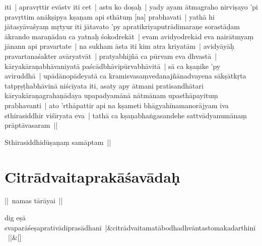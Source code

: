 \documentclass[article,12pt,a4paper]{memoir}%
\newcounter{parCount}
\begin{document}
	  \pstart \leavevmode%
	iti | apravṛttir evāstv iti cet | \label{thakur75-127.29} astu ko doṣaḥ | yady ayam ātmagraho nirviṣayo 'pi pravṛttim anākṣipya kṣaṇam api sthātuṃ [na] prabhavati | yathā hi jātasyāvaśyaṃ mṛtyur iti jātavato 'py apratikriyaputrādimaraṇe sorastāḍam ākrando maraṇādau ca yatnaḥ śokodrekāt | evam avidyodrekād eva nairātmyaṃ jānann api pravartate | na sukham āsta iti kim atra kriyatām | avidyāyāḥ pravartanaśakter avāryatvāt | \label{thakur75-128.3} pratyabhijñā ca pūrvam eva dhvastā | kāryakāraṇabhāvaniyatā paścādbhāvipūrvabhāvitā | sā ca kṣaṇike 'py aviruddhā | upādānopādeyatā ca kramisvasaṃvedanajñānadvayena sākṣātkṛta tatpṛṣṭhabhāvinā niścīyata iti, \label{thakur75-128.6} asaty apy ātmani pratisandhātari kāryakāraṇagrahaṇādaya upapadyamānā nātmānam upasthāpayituṃ prabhavanti | ato 'rthāpattir api na kṣameti bhāgyahīnamanorājyam iva sthirasiddhir viśīryata eva | \label{thakur75-121.8} tathā ca kṣaṇabhaṅgasandehe sattvādyanumānaṃ prāptāvasaram ||
	{}
	\pend%
      

	  \pstart \leavevmode%
	Sthirasiddhidūṣaṇaṃ samāptam || 
	{}
	\pend%
      
	    
	    \endnumbering%
	    \endgroup
	    
	  
	  
	
	    
	    \begingroup
	    \beginnumbering%
	    
	  
\chapter*[{Citrādvaitaprakāśavādaḥ}]{Citrādvaitaprakāśavādaḥ}\label{Citrādvaitaprakāśavādaḥ}

	  \pstart \leavevmode%
	\label{thakur75-129.4}|| namas tārāyai || 
	{}
	\pend%
      
	    
	    \stanza[\smallbreak]
	  dig eṣā svaparāśeṣaprativādiprasādhanī |&citrādvaitamatābodhadhvāntastomakadarthinī ||\&[\smallbreak]
	  
\end{document}
